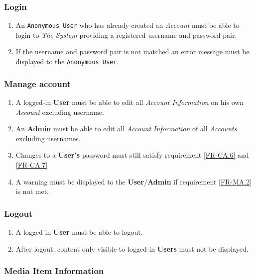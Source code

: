 \documentclass[../report.tex]{subfiles}
\begin{document}
\subsubsection {Login}
	
\begin{enumerate}[label=\textbf{FR-\twodigits*}, resume]
	\item An \texttt{Anonymous User} who has already created an \textit{Account} must be able to login to \textit{The System} providing a registered username and password pair.
	\item If the username and password pair is not matched an error message must be displayed to the \texttt{Anonymous User}. 
\end{enumerate}
		
\subsubsection {Manage account}

\begin{enumerate}[label=\textbf{FR-\twodigits*}, resume]
	\item A logged-in \textbf{User} must be able to edit all \textit{Account Information} on his own \textit{Account} excluding username.
	\item An \textbf{Admin} must be able to edit all \textit{Account Information} of all \textit{Accounts} excluding usernames.
	\item Changes to a \textbf{User's} password must still satisfy requirement \ref{FR-CA.6} and \ref{FR-CA.7} \label{FR-MA.2}
	\item A warning must be displayed to the \textbf{User}/\textbf{Admin} if requirement \ref{FR-MA.2} is not met.	
\end{enumerate}
		
\subsubsection {Logout}
\begin{enumerate}[label=\textbf{FR-\twodigits*}, resume]
	\item A logged-in \textbf{User} must be able to logout.
	\item After logout, content only visible to logged-in \textbf{Users} must not be displayed.
\end{enumerate}
	
\subsubsection {Media Item Information} \label{FR-Media}
\end{document}
